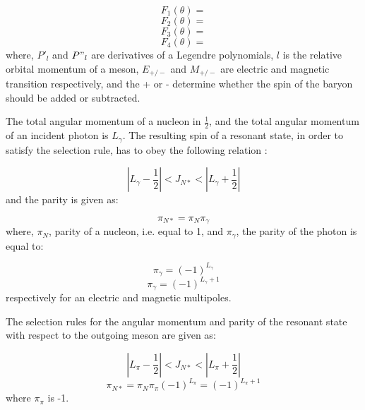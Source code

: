 \begin{equation}
F_{1}(\theta)=
\end{equation}
\begin{equation}
F_{2}(\theta)=
\end{equation}
\begin{equation}
F_{3}(\theta)=
\end{equation}
\begin{equation}
F_{4}(\theta)=
\end{equation}
where, $P'_{l}$ and $P"_{l}$ are derivatives of a Legendre polynomials, $l$ is the relative orbital momentum of a meson, $E_{+/-}$ and $M_{+/-}$ are electric and magnetic transition respectively, and the + or - determine whether the spin of the baryon should be added or subtracted.

\indent The total angular momentum of a nucleon in $\frac{1}{2}$, and the total angular momentum of an incident photon is $L_{\gamma}$. The resulting spin of a resonant state, in order to satisfy the selection rule, has to obey the following relation \cite{krusche}:

\begin{equation}
|L_{\gamma}-\frac{1}{2}|<J_{N*}<|L_{\gamma}+\frac{1}{2}|
\end{equation}
and the parity is given as:

\begin{equation}
\pi_{N*}=\pi_{N}\pi_{\gamma}
\end{equation}
where, $\pi_{N}$, parity of a nucleon, i.e. equal to 1, and $\pi_{\gamma}$, the parity of the photon is equal to:

\begin{equation}
\pi_{\gamma}=(-1)^{L_{\gamma}}
\end{equation}
\begin{equation}
\pi_{\gamma}=(-1)^{L_{\gamma}+1}
\end{equation}
respectively for an electric and magnetic multipoles.

\indent The selection rules for the angular momentum and parity of the resonant state with respect to the outgoing meson are given as:

\begin{equation}
|L_{\pi}-\frac{1}{2}|<J_{N*}<|L_{\pi}+\frac{1}{2}|
\end{equation}
\begin{equation}
\pi_{N*}=\pi_{N}\pi_{\pi}(-1)^{L_{\pi}}=(-1)^{L_{\pi}+1}
\end{equation}
where $\pi_{\pi}$ is -1.

